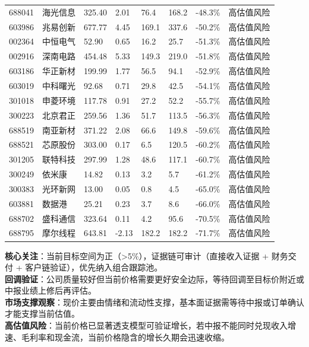 \begin{exhibitbox}
\begin{longtable}{L{1.5cm}L{2.0cm}R{1.3cm}R{1.3cm}R{1.3cm}R{1.5cm}R{1.3cm}L{1.8cm}}
688041 & 海光信息 & 325.40 & 2.01 & 76.4 & 168.2 & -48.3\% & 高估值风险\\
603986 & 兆易创新 & 677.77 & 4.45 & 169.1 & 337.6 & -50.2\% & 高估值风险\\
002364 & 中恒电气 & 52.90 & 0.65 & 16.2 & 25.7 & -51.3\% & 高估值风险\\
002916 & 深南电路 & 454.48 & 5.33 & 149.3 & 219.0 & -51.8\% & 高估值风险\\
603186 & 华正新材 & 199.99 & 1.77 & 56.5 & 94.1 & -52.9\% & 高估值风险\\
603019 & 中科曙光 & 92.68 & 0.71 & 29.8 & 42.5 & -54.1\% & 高估值风险\\
301018 & 申菱环境 & 117.78 & 0.91 & 27.2 & 52.2 & -55.7\% & 高估值风险\\
300223 & 北京君正 & 259.56 & 1.36 & 51.7 & 113.5 & -56.3\% & 高估值风险\\
688519 & 南亚新材 & 371.22 & 2.08 & 66.6 & 149.8 & -59.6\% & 高估值风险\\
688521 & 芯原股份 & 303.00 & 0.17 & 6.5 & 120.5 & -60.2\% & 高估值风险\\
301205 & 联特科技 & 297.99 & 1.28 & 48.6 & 117.1 & -60.7\% & 高估值风险\\
300249 & 依米康 & 14.82 & 0.13 & 3.2 & 5.7 & -61.2\% & 高估值风险\\
300383 & 光环新网 & 13.00 & 0.05 & 0.8 & 4.5 & -65.0\% & 高估值风险\\
603881 & 数据港 & 25.21 & 0.23 & 3.7 & 8.6 & -66.0\% & 高估值风险\\
688702 & 盛科通信 & 323.64 & 0.11 & 4.2 & 95.6 & -70.5\% & 高估值风险\\
688795 & 摩尔线程 & 643.81 & -2.13 & 182.2 & 182.2 & -71.7\% & 高估值风险\\
\bottomrule
\end{longtable}
\end{exhibitbox}

\begin{riskbox}[动作标签定义]
\textbf{核心关注}：当前目标空间为正（>5\%），证据链可审计（直接收入证据 + 财务交付 + 客户链验证），优先纳入组合跟踪池。\\
\textbf{回调验证}：公司质量较好但当前价格需要更好安全边际，等待回调至目标价附近或中报业绩上修后再评估。\\
\textbf{市场支撑观察}：现价主要由情绪和流动性支撑，基本面证据需等待中报或订单确认才能支撑当前估值。\\
\textbf{高估值风险}：当前价格已显著透支模型可验证增长，若中报不能同时兑现收入增速、毛利率和现金流，当前价格隐含的增长久期会迅速收缩。
\end{riskbox}

